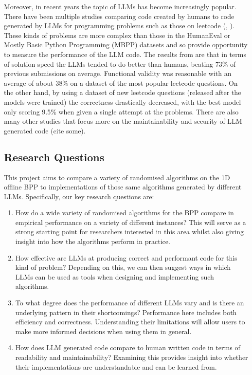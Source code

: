 \documentclass[12pt]{article}
\begin{document}
Moreover, in recent years the topic of LLMs has become increasingly popular. There have been multiple studies comparing code created by humans to code generated by LLMs for programming problems such as those on leetcode (\cite{wang}, \cite{coignion}). These kinds of problems are more complex than those in the HumanEval or Mostly Basic Python Programming (MBPP) datasets and so provide opportunity to measure the performance of the LLM code. The results from \cite{coignion} are that in terms of solution speed the LLMs tended to do better than humans, beating 73\% of previous submissions on average. Functional validity was reasonable with an average of about 38\% on a dataset of the most popular leetcode questions. On the other hand, by using a dataset of new leetcode questions (released after the models were trained) the correctness drastically decreased, with the best model only scoring 9.5\% when given a single attempt at the problems. There are also many other studies that focus more on the maintainability and security of LLM generated code (cite some).  

\subsection{Research Questions}
This project aims to compare a variety of randomised algorithms on the 1D offline BPP to implementations of those same algorithms generated by different LLMs. Specifically, our key research questions are: 
\begin{enumerate}
    \item How do a wide variety of randomised algorithms for the BPP compare in empirical performance on a variety of different instances? This will serve as a strong starting point for researchers interested in this area whilst also giving insight into how the algorithms perform in practice. 
    \item How effective are LLMs at producing correct and performant code for this kind of problem? Depending on this, we can then suggest ways in which LLMs can be used as tools when designing and implementing such algorithms. 
    \item To what degree does the performance of different LLMs vary and is there an underlying pattern in their shortcomings? Performance here includes both efficiency and correctness. Understanding their limitations will allow users to make more informed decisions when using them in general. 
    \item How does LLM generated code compare to human written code in terms of readability and maintainability? Examining this provides insight into whether their implementations are understandable and can be learned from.
\end{enumerate}
\end{document}
